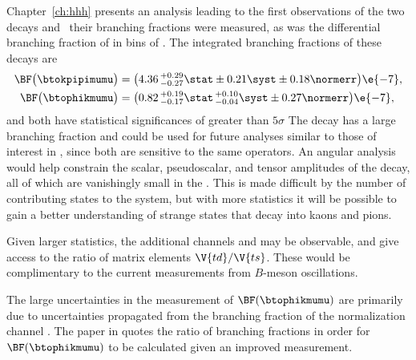 
Chapter~\ref{ch:hhh} presents an analysis leading to the first observations of the two decays
\btokpipimumu and \btophikmumu\, their branching fractions were measured, as was the differential
branching fraction of \btokpipimumu in bins of \qsq.
The integrated branching fractions of these decays are
\begin{align*}
  \BF\big( \btokpipimumu \big)&=
  \big(4.36\,^{+0.29}_{-0.27}\stat\pm0.21\syst\pm0.18\normerr\big)\e{-7}, \\
  \BF\big(\btophikmumu\big)&=
  \big(0.82\,^{+0.19}_{-0.17}\stat\,^{+0.10}_{-0.04}\syst\pm0.27\normerr\big)\e{-7},
\end{align*}
and both have statistical significances of greater than $5\sigma$
The decay \btokpipimumu has a large branching fraction and could be used for future analyses
similar to those of interest in \btokstrmumu, since both are sensitive to the same operators.
An angular analysis would help constrain the scalar, pseudoscalar, and tensor amplitudes of the
decay, all of which are vanishingly small in the \sm.
This is made difficult by the number of contributing states to the \kpipi system,
but with more statistics it will be possible to gain a better understanding of
strange states that decay into kaons and pions.

Given larger statistics, the additional channels \decay{\Bp}{\Kp\Km\pip\mumu} and
\decay{\Bp}{\pip\pipi\mumu}
may be observable, and give access to the ratio of \ckm matrix elements $\V{td}/\V{ts}$.
These would be complimentary to the current
measurements from $B$-meson oscillations.

The large uncertainties in the measurement of $\BF(\btophikmumu)$ are primarily due to
uncertainties propagated from the branching fraction of the normalization channel \btojpsiphik.
The paper in  quotes the ratio of branching fractions in order for
$\BF(\btophikmumu)$ to be calculated given an improved measurement.



